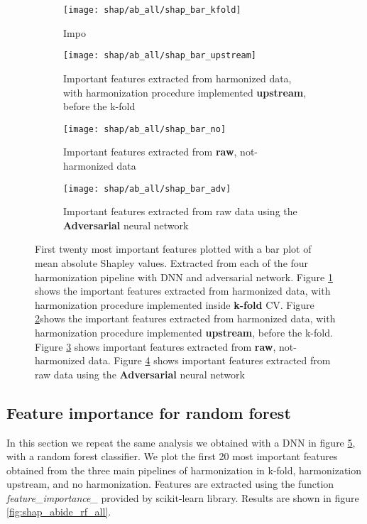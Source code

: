 \documentclass[11pt]{report}
\begin{document}
\begin{figure}[h!]
\centering
\begin{subfigure}[c]{.45\linewidth}
  \texttt{[image: shap/ab\_all/shap\_bar\_kfold]}
   \caption{Impo}
   \label{fig:shap_bar_kfold_}
\end{subfigure}
\begin{subfigure}[c]{.45\textwidth}
   \texttt{[image: shap/ab\_all/shap\_bar\_upstream]}
   \caption{Important features extracted from harmonized data, with harmonization procedure implemented \textbf{upstream}, before the k-fold}
     \label{fig:shap_abide_all_up}
\end{subfigure}
\hspace{3mm}
\begin{subfigure}[c]{.45\textwidth}
   \texttt{[image: shap/ab\_all/shap\_bar\_no]}
   \caption{Important features extracted from \textbf{raw}, not-harmonized data}
     \label{fig:shap_abide_all_no}
\end{subfigure}
\begin{subfigure}[c]{.45\textwidth}
   \texttt{[image: shap/ab\_all/shap\_bar\_adv]}
   \caption{Important features extracted from raw data using the \textbf{Adversarial} neural network}
   \label{fig:shap_abide_all_adv}
\end{subfigure}
\caption{First twenty most important features plotted with a bar plot of mean absolute Shapley values. Extracted from each of the four harmonization pipeline with DNN and adversarial network.
Figure \ref{fig:shap_bar_kfold_} shows the important features extracted from harmonized data, with harmonization procedure implemented inside \textbf{k-fold} CV.
Figure \ref{fig:shap_abide_all_up}shows the important features extracted from harmonized data, with harmonization procedure implemented \textbf{upstream}, before the k-fold.
Figure \ref{fig:shap_abide_all_no} shows important features extracted from \textbf{raw}, not-harmonized data.
Figure \ref{fig:shap_abide_all_adv} shows important features extracted from raw data using the \textbf{Adversarial} neural network
}
\label{fig:shap_abide_all} 

\end{figure}





\subsection{Feature importance for random forest}\label{sec:feature_importance_rf}
In this section we repeat the same analysis we obtained with a DNN in figure \ref{fig:shap_abide_all}, with a random forest classifier.
We plot the first 20 most important features obtained from the three main pipelines of harmonization in k-fold, harmonization upstream, and no harmonization.
Features are extracted using the function \emph{feature\_importance\_} provided by scikit-learn library.
Results are shown in figure \ref{fig:shap_abide_rf_all}. 
\end{document}
